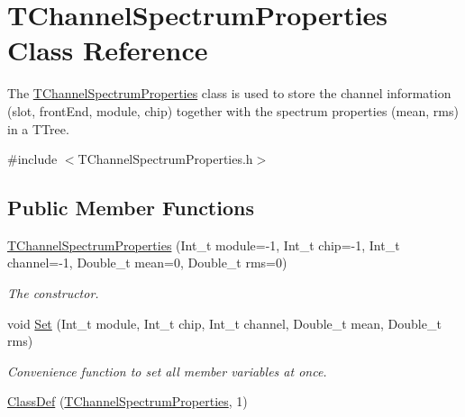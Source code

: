 \hypertarget{class_t_channel_spectrum_properties}{
\section{TChannelSpectrumProperties Class Reference}
\label{class_t_channel_spectrum_properties}
}


The \hyperlink{class_t_channel_spectrum_properties}{TChannelSpectrumProperties} class is used to store the channel information (slot, frontEnd, module, chip) together with the spectrum properties (mean, rms) in a TTree.  


{\ttfamily \#include $<$TChannelSpectrumProperties.h$>$}\subsection*{Public Member Functions}
\begin{DoxyCompactItemize}
\item 
\hyperlink{class_t_channel_spectrum_properties_ac1d3286952893fa565cbfd8227e84ff3}{TChannelSpectrumProperties} (Int\_\-t module=-\/1, Int\_\-t chip=-\/1, Int\_\-t channel=-\/1, Double\_\-t mean=0, Double\_\-t rms=0)
\begin{DoxyCompactList}\small\item\em The constructor. \item\end{DoxyCompactList}\item 
void \hyperlink{class_t_channel_spectrum_properties_a3ddfb6dfbbed5b502f1ddf5a40c387ba}{Set} (Int\_\-t module, Int\_\-t chip, Int\_\-t channel, Double\_\-t mean, Double\_\-t rms)
\begin{DoxyCompactList}\small\item\em Convenience function to set all member variables at once. \item\end{DoxyCompactList}\item 
\hyperlink{class_t_channel_spectrum_properties_a4b92e78edcf807e0353d5b059c55aa9c}{ClassDef} (\hyperlink{class_t_channel_spectrum_properties}{TChannelSpectrumProperties}, 1)
\end{DoxyCompactItemize}
